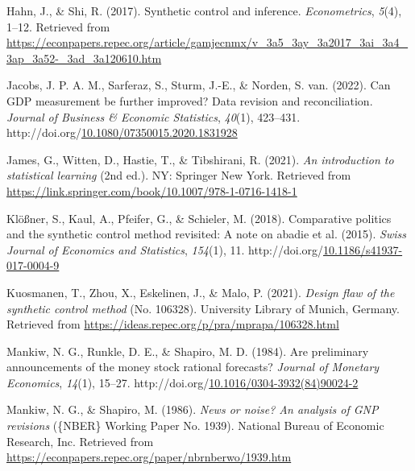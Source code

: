 \documentclass[12pt,nobind, a4paper]{reedthesis}
\newlength{\cslhangindent}
\newenvironment{CSLReferences}[2] %
{%
	\setlength{\parindent}{0pt}
	\ifodd #1 \everypar{\setlength{\hangindent}{\cslhangindent}}\ignorespaces\fi
	\ifnum #2 > 0
	\setlength{\parskip}{#2\baselineskip}
	\fi
}%
{}
\begin{document}
\begin{CSLReferences}{1}{0}
 \leavevmode{}%
 Hahn, J., \& Shi, R. (2017). Synthetic control and inference. \emph{Econometrics}, \emph{5}(4), 1--12. Retrieved from \url{https://econpapers.repec.org/article/gamjecnmx/v_3a5_3ay_3a2017_3ai_3a4_3ap_3a52-_3ad_3a120610.htm}

 \leavevmode{}%
 Jacobs, J. P. A. M., Sarferaz, S., Sturm, J.-E., \& Norden, S. van. (2022). Can {GDP} measurement be further improved? Data revision and reconciliation. \emph{Journal of Business \& Economic Statistics}, \emph{40}(1), 423--431. http://doi.org/\href{https://doi.org/10.1080/07350015.2020.1831928}{10.1080/07350015.2020.1831928}

 \leavevmode{}%
 James, G., Witten, D., Hastie, T., \& Tibshirani, R. (2021). \emph{An introduction to statistical learning} (2nd ed.). {NY}: Springer New York. Retrieved from \url{https://link.springer.com/book/10.1007/978-1-0716-1418-1}

 \leavevmode{}%
 Klößner, S., Kaul, A., Pfeifer, G., \& Schieler, M. (2018). Comparative politics and the synthetic control method revisited: A note on abadie et al. (2015). \emph{Swiss Journal of Economics and Statistics}, \emph{154}(1), 11. http://doi.org/\href{https://doi.org/10.1186/s41937-017-0004-9}{10.1186/s41937-017-0004-9}

 \leavevmode{}%
 Kuosmanen, T., Zhou, X., Eskelinen, J., \& Malo, P. (2021). \emph{Design flaw of the synthetic control method} (No. 106328). University Library of Munich, Germany. Retrieved from \url{https://ideas.repec.org/p/pra/mprapa/106328.html}

 \leavevmode{}%
 Mankiw, N. G., Runkle, D. E., \& Shapiro, M. D. (1984). Are preliminary announcements of the money stock rational forecasts? \emph{Journal of Monetary Economics}, \emph{14}(1), 15--27. http://doi.org/\href{https://doi.org/10.1016/0304-3932(84)90024-2}{10.1016/0304-3932(84)90024-2}

 \leavevmode{}%
 Mankiw, N. G., \& Shapiro, M. (1986). \emph{News or noise? An analysis of {GNP} revisions} (\{NBER\} Working Paper No. 1939). National Bureau of Economic Research, Inc. Retrieved from \url{https://econpapers.repec.org/paper/nbrnberwo/1939.htm}


\end{CSLReferences}
\end{document}
